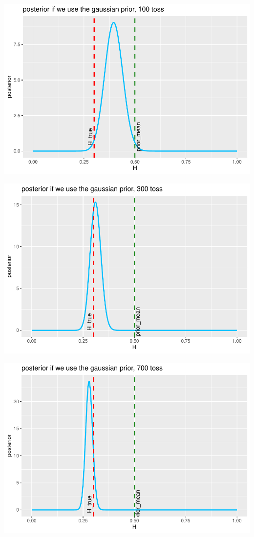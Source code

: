 \documentclass[
]{article}
\begin{document}
\begin{center}\includegraphics[width=0.75\linewidth]{astrostat-1_files/figure-latex/unnamed-chunk-13-1} \end{center}

\begin{center}\includegraphics[width=0.75\linewidth]{astrostat-1_files/figure-latex/unnamed-chunk-14-1} \end{center}

\begin{center}\includegraphics[width=0.75\linewidth]{astrostat-1_files/figure-latex/unnamed-chunk-15-1} \end{center}
\end{document}

